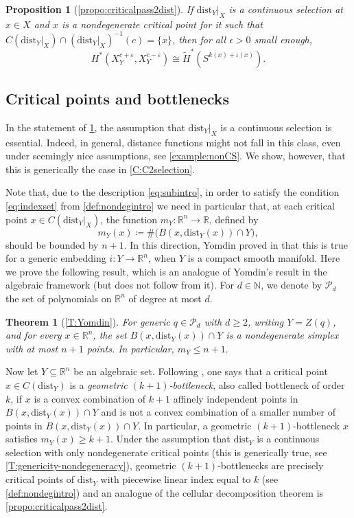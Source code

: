 \documentclass{amsart}
\newcommand{\R}{\mathbb{R}}
\newcommand{\dd}{\mathrm{dist}}
\newcommand{\dist}{{\mathrm{dist}_Y|_X}}
\newcommand{\Poly}{\mathscr{P}}
\def\lini{k}
\def\quadi{\iota}
\newtheorem{theorem}[subsubsection]{Theorem}
\newtheorem{proposition}[subsubsection]{Proposition}
\theoremstyle{definition}
\theoremstyle{remark}
\begin{document}
\begin{proposition}[\cref{propo:criticalpass2dist}]
\label{propo:passintro}
If $\dist$ is a continuous selection at $x \in X$ and $x$ is a nondegenerate critical point for it such that $C(\dist)\cap (\dist)^{-1}(c) = \{x\}$, then for all $\epsilon > 0$ small enough,
\[
H^*(X^{c + \varepsilon}_Y, X^{c - \varepsilon}_Y) \cong \widetilde{H}^*(S^{\lini(x)+\quadi(x)}).
\]
\end{proposition}

\subsection{Critical points and bottlenecks}
In the statement of \cref{propo:passintro}, the assumption that $\dist$ is a continuous selection is essential. Indeed, in general, distance functions might not fall in this class, even under seemingly nice assumptions, see \cref{example:nonCS}. We show, however, that this is generically the case in \cref{C:C2selection}.

Note that, due to the description \eqref{eq:subintro}, in order to satisfy the condition \ref{eq:indexset} from \cref{def:nondegintro} we need in particular that, at each critical point $x \in C(\dist)$, the function $m_Y \colon \R^n\to \R$, defined by
\[
m_Y(x) \coloneqq \# \Big( B(x, \dd_Y(x))\cap Y \Big),
\]
should be bounded by $n+1$.
In this direction, Yomdin proved in \cite[Proposition 3]{Yomdin1981} that this is true for a generic embedding $i \colon Y \to \R^n$, when $Y$ is a compact smooth manifold. Here we prove the following result, which is an analogue of Yomdin's result in the algebraic framework (but does not follow from it).
For $d\in \mathbb{N}$, we denote by $\Poly_d$ the set of polynomials on $\R^n$ of degree at most $d$.

\begin{theorem}[\cref{T:Yomdin}]
\label{T:Yomdinintro}
For generic $q \in \Poly_d$ with $d \geq 2$, writing $Y = Z(q)$,  and for every $x\in\R^n$, the set $B(x, \dd_Y(x)) \cap Y$ is a nondegenerate simplex with at most $n + 1$ points. In particular, $m_Y \leq n + 1.$
\end{theorem}

Now let $Y \subseteq \R^n$ be an algebraic set. Following \cite{DEEGH2023}, one says that a critical point $x \in C(\dd_Y)$ is a \emph{geometric $(k+1)$-bottleneck}, also called bottleneck of order $k$, if 
$x$ is a convex combination of $k+1$ affinely independent points in $B(x, \dd_Y(x))\cap Y$ and is not a convex combination of a smaller number of points in $B(x, \dd_Y(x))\cap Y$. In particular, a geometric $(k+1)$-bottleneck $x$ satisfies $m_Y(x) \ge k+1$.
Under the assumption that $\dd_Y$ is a continuous selection with only nondegenerate critical points (this is generically true, see \cref{T:genericity-nondegeneracy}), geometric $(k+1)$-bottlenecks are precisely critical points of $\dd_Y$ with piecewise linear index equal to $k$ (see \cref{def:nondegintro}) and an analogue of the cellular decomposition theorem is \cref{propo:criticalpass2dist}. 
\end{document}
